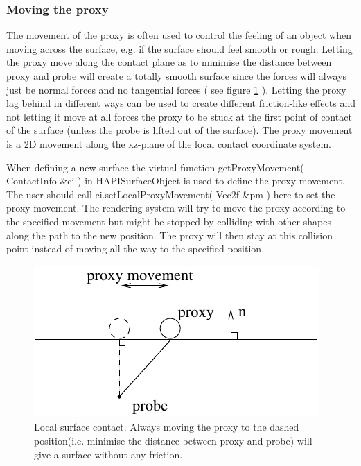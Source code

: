\subsubsection{Moving the proxy}
The movement of the proxy is often used to control the feeling of an object when moving across the surface, e.g. if the surface should feel smooth or rough. Letting the proxy move along the contact plane as to minimise the distance between proxy and probe will create a totally smooth surface since the forces will always just be normal forces and no tangential forces ( see figure \ref{proxy movement} ). Letting the proxy lag behind in different ways can be used to create different friction-like effects and not letting it move at all forces the proxy to be stuck at the first point of contact of the surface (unless the probe is lifted out of the surface). The proxy movement is a 2D movement along the xz-plane of the local contact coordinate system. 

When defining a new surface the virtual function {\ttfamily getProxyMovement( ContactInfo \&ci )} in HAPISurfaceObject is used to define the proxy movement. The user should call {\ttfamily ci.setLocalProxyMovement( Vec2f \&pm )} here to set the proxy movement. The rendering system will try to move the proxy according to the specified movement but might be stopped by colliding with other shapes along the path to the new position. The proxy will then stay at this collision point instead of moving all the way to the specified position.

\begin{figure} 
  \centering 
  \includegraphics{images/surface.pdf}
  \caption{Local surface contact. Always moving the proxy to the dashed position(i.e. minimise the distance between proxy and probe) will give a surface without any friction.}
  \label{proxy movement} 
\end{figure}

